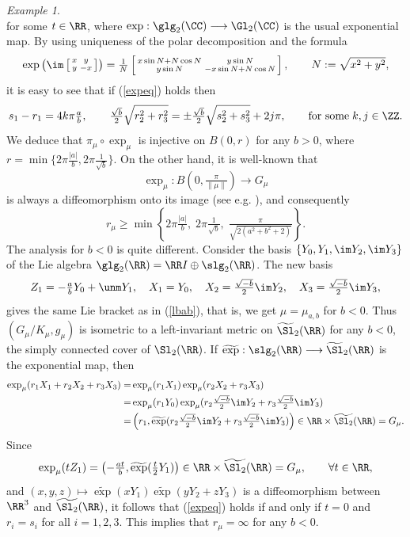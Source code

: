 \documentclass[11pt]{amsart}
\theoremstyle{plain}
\theoremstyle{definition}
\theoremstyle{remark}
\newtheorem{example}[theorem]{Example}
\begin{document}
\begin{example}
$$$$
for some $t\in\RR$, where $\exp:\glg_2(\CC)\longrightarrow\Gl_2(\CC)$ is the usual exponential map.  By using uniqueness of the polar decomposition and the formula
$$
\exp\left(\im\left[\begin{smallmatrix} x&y \\ y&-x \end{smallmatrix}\right]\right)=
\tfrac{1}{N}\left[\begin{smallmatrix} x\sin{N}+N\cos{N}& y\sin{N} \\ y\sin{N}& -x\sin{N}+N\cos{N}\end{smallmatrix}\right],\qquad N:=\sqrt{x^2+y^2},
$$
it is easy to see that if (\ref{expeq}) holds then
$$
s_1-r_1=4k\pi\tfrac{a}{b}, \qquad \tfrac{\sqrt{b}}{2}\sqrt{r_2^2+r_3^2}=\pm\tfrac{\sqrt{b}}{2}\sqrt{s_2^2+s_3^2}+2j\pi , \qquad\mbox{for some}\; k,j\in\ZZ.
$$
We deduce that $\pi_\mu\circ\exp_\mu$ is injective on $B(0,r)$ for any $b>0$, where $r=\min\{2\pi\tfrac{|a|}{b}, 2\pi\tfrac{1}{\sqrt{b}}\}$.  On the other hand, it is well-known that
\begin{equation}\label{expdif}
\exp_\mu:B(0,\tfrac{\pi}{\|\mu\|})\longrightarrow G_\mu
\end{equation}
is always a diffeomorphism onto its image (see e.g. \cite[Lemma 6.19]{spacehm}), and consequently
$$
r_\mu\geq \min\left\{2\pi\tfrac{|a|}{b},\; 2\pi\tfrac{1}{\sqrt{b}},\; \tfrac{\pi}{\sqrt{2(a^2+b^2+2)}}\right\}.
$$
The analysis for $b<0$ is quite different.  Consider the basis $\{ Y_0,Y_1,\im Y_2,\im Y_3\}$ of the Lie algebra $\glg_2(\RR)=\RR I\oplus\slg_2(\RR)$.  The new basis
$$
Z_1=-\tfrac{a}{b}Y_0+\unm Y_1, \quad X_1=Y_0, \quad X_2=\tfrac{\sqrt{-b}}{2}\im Y_2, \quad X_3=\tfrac{\sqrt{-b}}{2}\im Y_3,
$$
gives the same Lie bracket as in (\ref{lbab}), that is, we get $\mu=\mu_{a,b}$ for $b<0$.  Thus $(G_\mu/K_\mu,g_\mu)$ is isometric to a left-invariant metric on $\widetilde{\Sl}_2(\RR)$ for any $b<0$, the simply connected cover of $\Sl_2(\RR)$.  If $\widetilde{\exp}:\slg_2(\RR)\longrightarrow\widetilde{\Sl}_2(\RR)$ is the exponential map, then
\begin{align*}
\exp_\mu(r_1X_1+r_2X_2+r_3X_3)=& \exp_\mu(r_1X_1)\exp_\mu(r_2X_2+r_3X_3) \\
=&\exp_\mu(r_1Y_0)\exp_\mu(r_2\tfrac{\sqrt{-b}}{2}\im Y_2+r_3\tfrac{\sqrt{-b}}{2}\im Y_3) \\
=& \left(r_1,\widetilde{\exp}(r_2\tfrac{\sqrt{-b}}{2}\im Y_2+r_3\tfrac{\sqrt{-b}}{2}\im Y_3)\right)\in\RR\times\widetilde{\Sl_2}(\RR)=G_\mu.
\end{align*}
Since
$$
\exp_\mu(tZ_1)=\left(-\tfrac{at}{b},\widetilde{\exp}(\tfrac{t}{2}Y_1)\right)\in\RR\times\widetilde{\Sl_2}(\RR)=G_\mu, \qquad\forall t\in\RR,
$$
and $(x,y,z)\mapsto\widetilde{\exp}(xY_1)\widetilde{\exp}(yY_2+zY_3)$ is a diffeomorphism between $\RR^3$ and $\widetilde{\Sl_2}(\RR)$, it follows that (\ref{expeq}) holds if and only if $t=0$ and $r_i=s_i$ for all $i=1,2,3$.  This implies that $r_\mu=\infty$ for any $b<0$.


\end{example}
\end{document}
